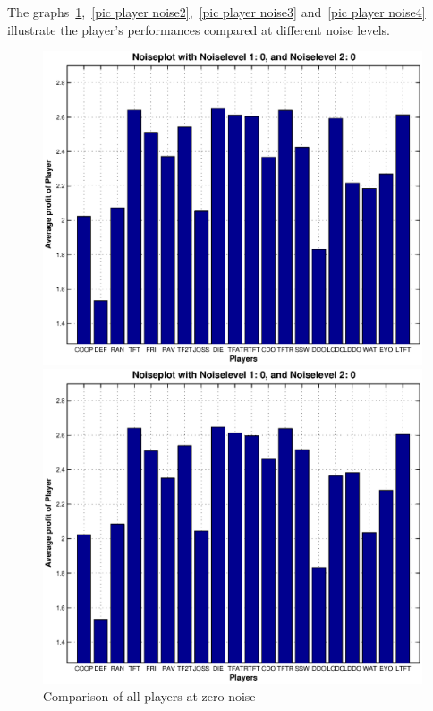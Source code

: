 The graphs~\ref{pic player noise1},~\ref{pic player noise2},~\ref{pic player noise3} and~\ref{pic player noise4} illustrate the player's performances compared at different noise levels.\\


\begin{figure}[h]
	\caption{Comparison of all players at zero noise}
	\label{pic player noise1}
\begin{minipage}[hbt]{0.68\textwidth}
	\centering
	\includegraphics[width=\textwidth]{pics/simulation1/Reward_of__all_Players_at_given_Noiselevels_1}
\end{minipage}
\hfill
\begin{minipage}[hbt]{0.3\textwidth}
	\centering
	\includegraphics[width=\textwidth]{pics/simulation2/Reward_of_all_Players_at_given_Noiselevels_1}
\end{minipage}
\end{figure}

